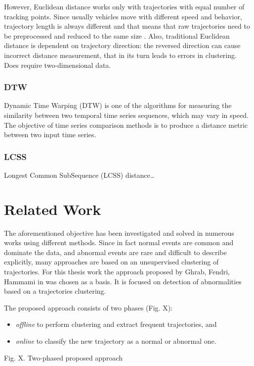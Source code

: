 However, Euclidean distance works only with trajectories with equal number of tracking points. Since usually vehicles move with different speed and behavior, trajectory length is always different and that means that raw trajectories need to be preprocessed and reduced to the same size \cite{inproceedings:7_related_work}. Also, traditional Euclidean distance is dependent on trajectory direction: the reversed direction can cause incorrect distance measurement, that in its turn leads to errors in clustering. Does require two-dimensional data.


\subsubsection{DTW}
Dynamic Time Warping (DTW) is one of the algorithms for measuring the similarity between two temporal time series sequences, which may vary in speed. The objective of time series comparison methods is to produce a distance metric between two input time series.

\subsubsection{LCSS}
Longest Common SubSequence (LCSS) distance…


\section{Related Work}
The aforementioned objective has been investigated and solved in numerous works using different methods. Since in fact normal events are common and dominate the data, and abnormal events are rare and difficult to describe explicitly, many approaches are based on an unsupervised clustering of trajectories. For this thesis work the approach proposed by Ghrab, Fendri, Hammami in \cite{inproceedings:7_related_work} was chosen as a basis. It is focused on detection of abnormalities based on a trajectories clustering.

The proposed approach consists of two phases (Fig. X):
\begin{itemize}
	\item \textit{offline} to perform clustering and extract frequent trajectories, and
	\item \textit{online} to classify the new trajectory as a normal or abnormal one.
\end{itemize}

Fig. X. Two-phased proposed approach


